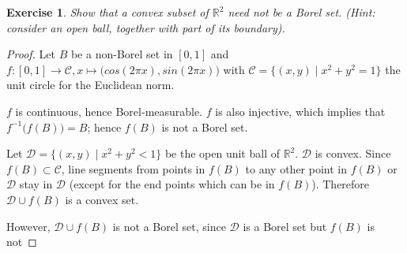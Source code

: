 \documentclass[11pt,a4paper,twoside]{article}
\newtheorem{exercise}{Exercise}
\begin{document}

\begin{exercise}
Show that a convex subset of $\mathbb{R}^2$ need not be a Borel
set. (Hint: consider an open ball, together with part of its
boundary).
\end{exercise}

\begin{proof}
Let $B$ be a non-Borel set in $[0,1]$ and $f : [0,1] \to \mathscr{C},
x \mapsto \big(cos(2\pi x), sin(2\pi x)\big)$ with $\mathscr{C} =
\{(x, y) \mid x^2 + y^2 = 1\}$ the unit circle for the Euclidean
norm.

$f$ is continuous, hence Borel-measurable. $f$ is also injective,
which implies that $f^{-1}\big(f(B)\big) = B$; hence $f(B)$ is not a
Borel set.

Let $\mathscr{D} = \{(x,y) \mid x^2 + y^2 < 1\}$ be the open unit ball
of $\mathbb{R}^2$. $\mathscr{D}$ is convex. Since $f(B) \subset
\mathscr{C}$, line segments from points in $f(B)$ to any other point
in $f(B)$ or $\mathscr{D}$ stay in $\mathscr{D}$ (except for the end
points which can be in $f(B)$). Therefore $\mathscr{D} \cup f(B)$ is a
convex set.

However, $\mathscr{D} \cup f(B)$ is not a Borel set, since
$\mathscr{D}$ is a Borel set but $f(B)$ is not
\end{proof}
\end{document}
